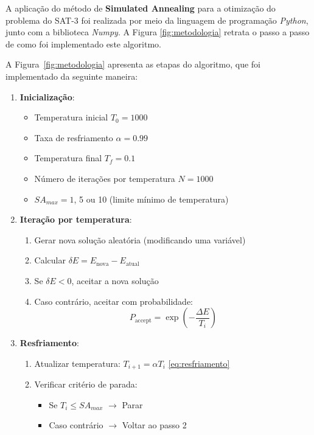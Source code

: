 \documentclass[12pt]{article}
\begin{document}
A aplicação do método de \textbf{Simulated Annealing} para a otimização do problema do SAT-3 foi realizada por meio da linguagem de programação \textit{Python}, junto com a biblioteca \textit{Numpy}.
%
A Figura \ref{fig:metodologia} retrata o passo a passo de como foi implementado este algoritmo.

A Figura~\ref{fig:metodologia} apresenta as etapas do algoritmo, que foi implementado da seguinte maneira:

\begin{enumerate}
    \item \textbf{Inicialização}:
    \begin{itemize}
        \item Temperatura inicial $T_0 = 1000$
        \item Taxa de resfriamento $\alpha = 0.99$
        \item Temperatura final $T_f = 0.1$
        \item Número de iterações por temperatura $N = 1000$
        \item $SA_{max} = 1$, 5 ou 10 (limite mínimo de temperatura)
    \end{itemize}
    
    \item \textbf{Iteração por temperatura}:
    \begin{enumerate}
        \item Gerar nova solução aleatória (modificando uma variável)
        \item Calcular $\delta E = E_{\text{nova}} - E_{\text{atual}}$
        \item Se $\delta E < 0$, aceitar a nova solução
        \item Caso contrário, aceitar com probabilidade:
        \begin{equation}
            P_{\text{accept}} = \exp\left(-\frac{\Delta E}{T_i}\right)
            \label{eq:probabilidade}
        \end{equation}
    \end{enumerate}
    
    \item \textbf{Resfriamento}:
    \begin{enumerate}
        \item Atualizar temperatura: $T_{i+1} = \alpha T_i$ \eqref{eq:resfriamento}
        \item Verificar critério de parada:
        \begin{itemize}
            \item Se $T_i \leq SA_{max}$ $\rightarrow$ Parar
            \item Caso contrário $\rightarrow$ Voltar ao passo 2
        \end{itemize}
    \end{enumerate}
\end{enumerate}
\end{document}
